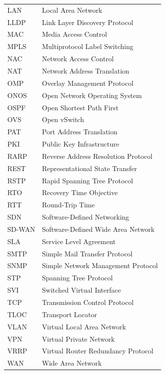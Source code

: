 {\begin{longtable}{ >{\centering\arraybackslash}p{3cm} p{9cm} }
    LAN & Local Area Network \\
    LLDP & Link Layer Discovery Protocol \\
    MAC & Media Access Control \\
    MPLS & Multiprotocol Label Switching \\
    NAC & Network Access Control \\
    NAT & Network Address Translation \\
    OMP & Overlay Management Protocol \\
    ONOS & Open Network Operating System \\
    OSPF & Open Shortest Path First \\
    OVS & Open vSwitch \\
    PAT & Port Address Translation \\
    PKI & Public Key Infrastructure \\
    RARP & Reverse Address Resolution Protocol \\
    REST & Representational State Transfer \\
    RSTP & Rapid Spanning Tree Protocol \\
    RTO & Recovery Time Objective \\
    RTT & Round-Trip Time \\
    SDN & Software-Defined Networking \\
    SD-WAN & Software-Defined Wide Area Network \\
    SLA & Service Level Agreement \\
    SMTP & Simple Mail Transfer Protocol \\
    SNMP & Simple Network Management Protocol \\
    STP & Spanning Tree Protocol \\
    SVI & Switched Virtual Interface \\
    TCP & Transmission Control Protocol \\
    TLOC & Transport Locator \\
    VLAN & Virtual Local Area Network \\
    VPN & Virtual Private Network \\
    VRRP & Virtual Router Redundancy Protocol \\
    WAN & Wide Area Network \\
\end{longtable}
}
